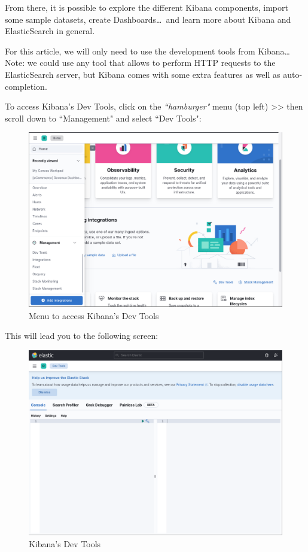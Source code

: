 \bigskip

From there, it is possible to explore the different Kibana components, import some sample datasets, create Dashboards\dots\ and learn more about Kibana and ElasticSearch in general. \\

\bigskip

For this article, we will only need to use the development tools from Kibana\dots \\

Note: we could use any tool that allows to perform HTTP requests to the ElasticSearch server, but Kibana comes with some extra features as well as auto-completion. \\


\newpage

To access Kibana's Dev Tools, click on the \emph{``hamburger"} menu (top left) >> then scroll down to ``Management" and select ``Dev Tools":


\begin{figure}[h]
	\centering
	\includegraphics[width=0.8\linewidth]{files/images/kibana-menu}
	\caption{Menu to access Kibana's Dev Tools}
	\label{fig:access-kibana-dev-tools}
\end{figure}

\bigskip

This will lead you to the following screen:

\begin{figure}[h]
	\centering
	\includegraphics[width=0.8\linewidth]{files/images/kibana-dev-tools}
	\caption{Kibana's Dev Tools}
	\label{fig:kibana-dev-tools}
\end{figure}

